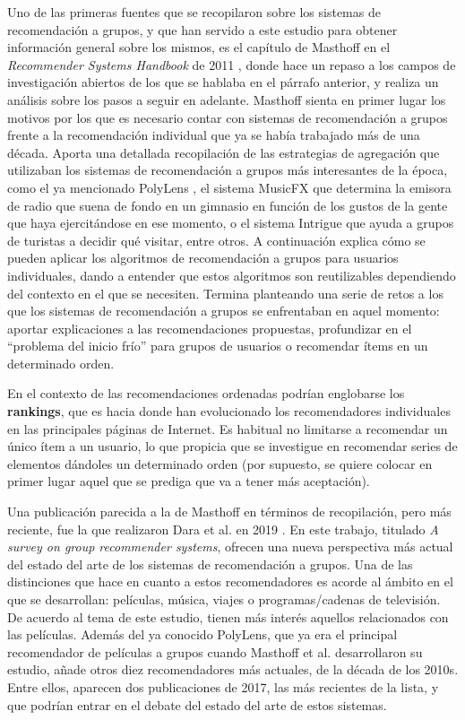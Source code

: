 Uno de las primeras fuentes que se recopilaron sobre los sistemas de recomendación a grupos, y que han servido a este estudio para obtener información general sobre los mismos, es el capítulo de Masthoff en el \textit{Recommender Systems Handbook} de 2011 \cite{masthoff-handbook}, donde hace un repaso a los campos de investigación abiertos de los que se hablaba en el párrafo anterior, y realiza un análisis sobre los pasos a seguir en adelante. Masthoff sienta en primer lugar los motivos por los que es necesario contar con sistemas de recomendación a grupos frente a la recomendación individual que ya se había trabajado más de una década. Aporta una detallada recopilación de las estrategias de agregación que utilizaban los sistemas de recomendación a grupos más interesantes de la época, como el ya mencionado PolyLens \cite{polylens}, el sistema MusicFX \cite{musicfx} que determina la emisora de radio que suena de fondo en un gimnasio en función de los gustos de la gente que haya ejercitándose en ese momento, o el sistema Intrigue \cite{intrigue} que ayuda a grupos de turistas a decidir qué visitar, entre otros. A continuación explica cómo se pueden aplicar los algoritmos de recomendación a grupos para usuarios individuales, dando a entender que estos algoritmos son reutilizables dependiendo del contexto en el que se necesiten. Termina planteando una serie de retos a los que los sistemas de recomendación a grupos se enfrentaban en aquel momento: aportar explicaciones a las recomendaciones propuestas, profundizar en el ``problema del inicio frío'' para grupos de usuarios o recomendar ítems en un determinado orden.

En el contexto de las recomendaciones ordenadas podrían englobarse los \textbf{rankings}, que es hacia donde han evolucionado los recomendadores individuales en las principales páginas de Internet. Es habitual no limitarse a recomendar un único ítem a un usuario, lo que propicia que se investigue en recomendar series de elementos dándoles un determinado orden (por supuesto, se quiere colocar en primer lugar aquel que se prediga que va a tener más aceptación).

Una publicación parecida a la de Masthoff en términos de recopilación, pero más reciente, fue la que realizaron Dara et al. en 2019 \cite{survey2019}. En este trabajo, titulado \textit{A survey on group recommender systems}, ofrecen una nueva perspectiva más actual del estado del arte de los sistemas de recomendación a grupos. Una de las distinciones que hace en cuanto a estos recomendadores es acorde al ámbito en el que se desarrollan: películas, música, viajes o programas/cadenas de televisión. De acuerdo al tema de este estudio, tienen más interés aquellos relacionados con las películas. Además del ya conocido PolyLens, que ya era el principal recomendador de películas a grupos cuando Masthoff et al. desarrollaron su estudio, añade otros diez recomendadores más actuales, de la década de los 2010s. Entre ellos, aparecen dos publicaciones de 2017, las más recientes de la lista, y que podrían entrar en el debate del estado del arte de estos sistemas.

